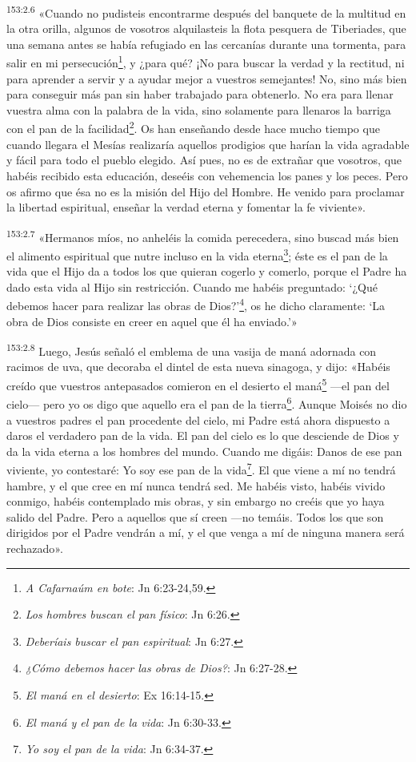 \par
\textsuperscript{153:2.6} «Cuando no pudisteis encontrarme después del banquete de la multitud en la otra orilla, algunos de vosotros alquilasteis la flota pesquera de Tiberiades, que una semana antes se había refugiado en las cercanías durante una tormenta, para salir en mi persecución\footnote{\textit{A Cafarnaúm en bote}: Jn 6:23-24,59.}, y ¿para qué? ¡No para buscar la verdad y la rectitud, ni para aprender a servir y a ayudar mejor a vuestros semejantes! No, sino más bien para conseguir más pan sin haber trabajado para obtenerlo. No era para llenar vuestra alma con la palabra de la vida, sino solamente para llenaros la barriga con el pan de la facilidad\footnote{\textit{Los hombres buscan el pan físico}: Jn 6:26.}. Os han enseñando desde hace mucho tiempo que cuando llegara el Mesías realizaría aquellos prodigios que harían la vida agradable y fácil para todo el pueblo elegido. Así pues, no es de extrañar que vosotros, que habéis recibido esta educación, deseéis con vehemencia los panes y los peces. Pero os afirmo que ésa no es la misión del Hijo del Hombre. He venido para proclamar la libertad espiritual, enseñar la verdad eterna y fomentar la fe viviente».

\par
\textsuperscript{153:2.7} «Hermanos míos, no anheléis la comida perecedera, sino buscad más bien el alimento espiritual que nutre incluso en la vida eterna\footnote{\textit{Deberíais buscar el pan espiritual}: Jn 6:27.}; éste es el pan de la vida que el Hijo da a todos los que quieran cogerlo y comerlo, porque el Padre ha dado esta vida al Hijo sin restricción. Cuando me habéis preguntado: `¿Qué debemos hacer para realizar las obras de Dios?'\footnote{\textit{¿Cómo debemos hacer las obras de Dios?}: Jn 6:27-28.}, os he dicho claramente: `La obra de Dios consiste en creer en aquel que él ha enviado.'»

\par
\textsuperscript{153:2.8} Luego, Jesús señaló el emblema de una vasija de maná adornada con racimos de uva, que decoraba el dintel de esta nueva sinagoga, y dijo: «Habéis creído que vuestros antepasados comieron en el desierto el maná\footnote{\textit{El maná en el desierto}: Ex 16:14-15.} ---el pan del cielo--- pero yo os digo que aquello era el pan de la tierra\footnote{\textit{El maná y el pan de la vida}: Jn 6:30-33.}. Aunque Moisés no dio a vuestros padres el pan procedente del cielo, mi Padre está ahora dispuesto a daros el verdadero pan de la vida. El pan del cielo es lo que desciende de Dios y da la vida eterna a los hombres del mundo. Cuando me digáis: Danos de ese pan viviente, yo contestaré: Yo soy ese pan de la vida\footnote{\textit{Yo soy el pan de la vida}: Jn 6:34-37.}. El que viene a mí no tendrá hambre, y el que cree en mí nunca tendrá sed. Me habéis visto, habéis vivido conmigo, habéis contemplado mis obras, y sin embargo no creéis que yo haya salido del Padre. Pero a aquellos que sí creen ---no temáis. Todos los que son dirigidos por el Padre vendrán a mí, y el que venga a mí de ninguna manera será rechazado».

